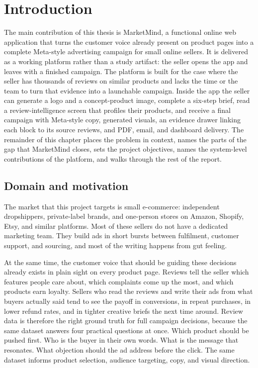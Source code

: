\documentclass[12pt,a4paper]{report}
\begin{document}
\chapter{Introduction}
\label{ch:introduction}

The main contribution of this thesis is MarketMind, a functional online web application that turns the customer voice already present on product pages into a complete Meta-style advertising campaign for small online sellers. It is delivered as a working platform rather than a study artifact: the seller opens the app and leaves with a finished campaign. The platform is built for the case where the seller has thousands of reviews on similar products and lacks the time or the team to turn that evidence into a launchable campaign. Inside the app the seller can generate a logo and a concept-product image, complete a six-step brief, read a review-intelligence screen that profiles their products, and receive a final campaign with Meta-style copy, generated visuals, an evidence drawer linking each block to its source reviews, and PDF, email, and dashboard delivery. The remainder of this chapter places the problem in context, names the parts of the gap that MarketMind closes, sets the project objectives, names the system-level contributions of the platform, and walks through the rest of the report.

\section{Domain and motivation}
\label{sec:domain}

The market that this project targets is small e-commerce: independent dropshippers, private-label brands, and one-person stores on Amazon, Shopify, Etsy, and similar platforms. Most of these sellers do not have a dedicated marketing team. They build ads in short bursts between fulfilment, customer support, and sourcing, and most of the writing happens from gut feeling.

At the same time, the customer voice that should be guiding these decisions already exists in plain sight on every product page. Reviews tell the seller which features people care about, which complaints come up the most, and which products earn loyalty. Sellers who read the reviews and write their ads from what buyers actually said tend to see the payoff in conversions, in repeat purchases, in lower refund rates, and in tighter creative briefs the next time around. Review data is therefore the right ground truth for full campaign decisions, because the same dataset answers four practical questions at once. Which product should be pushed first. Who is the buyer in their own words. What is the message that resonates. What objection should the ad address before the click. The same dataset informs product selection, audience targeting, copy, and visual direction.
\end{document}
